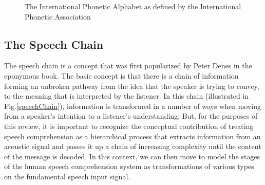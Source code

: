 \documentclass[titlepage]{article}
\begin{document}
  \begin{figure}
    \caption{The International Phonetic Alphabet as defined by the International
    Phonetic Association}
    \label{ipaChart}
  \end{figure}

  \subsection{The Speech Chain}

    The speech chain is a concept that was first popularized by Peter Denes \cite{Denes1993}
    in the eponymous book. The basic concept is that there is a chain of information forming
    an unbroken pathway from the idea that the speaker is trying to convey, to the meaning that
    is interpreted by the listener. In this chain (illustrated in Fig.\ref{speechChain}), information
    is transformed in a number of ways when moving from a speaker's intention to a listener's
    understanding. But, for the purposes of this review, it is important to recognize the
    conceptual contribution of treating speech comprehension as a hierarchical process
    that extracts information from an acoustic signal and passes it up a chain of increasing
    complexity until the content of the message is decoded. In this context, we can then move
    to model the stages of the human speech comprehension system as transformations of
    various types on the fundamental speech input signal.
\end{document}
